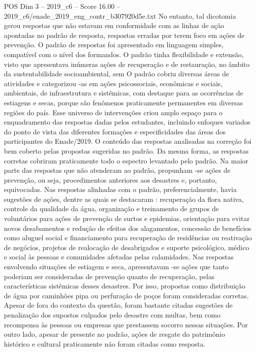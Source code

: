 \begin{textsample}{POS Dim 3 – 2019\_c6 – Score 16.00 – 2019\_c6/enade\_2019\_eng\_contr\_b307920d5e.txt}
No entanto, tal dicotomia gerou respostas que não estavam em conformidade com as linhas de ação apontadas no padrão de resposta, respostas erradas por terem foco em ações de prevenção.
O padrão de respostas foi apresentado em linguagem simples, compatível com o nível dos formandos.
O padrão tinha flexibilidade e extensão, visto que apresentava inúmeras ações de recuperação e de restauração, no âmbito da sustentabilidade socioambiental, sem O padrão cobriu diversas áreas de atividades e categorizou -as em ações psicossociais, econômicas e sociais, ambientais, de infraestrutura e sistêmicas, com destaque para as ocorrências de estiagens e secas, porque são fenômenos praticamente permanentes em diversas regiões do país.
Esse universo de intervenções criou amplo espaço para o enquadramento das respostas dadas pelos estudantes, incluindo enfoques variados do ponto de vista das diferentes formações e especificidades das áreas dos participantes do Enade/2019.
O conteúdo das respostas analisadas na correção foi bem coberto pelas propostas sugeridas no padrão.
Da mesma forma, as respostas corretas cobriram praticamente todo o espectro levantado pelo padrão.
Na maior parte das respostas que não atenderam ao padrão, propunham -se ações de prevenção, ou seja, procedimentos anteriores aos desastres e, portanto, equivocadas.
Nas respostas alinhadas com o padrão, preferencialmente, havia sugestões de ações, dentre as quais se destacaram : recuperação da flora nativa, controle da qualidade da água, organização e treinamento de grupos de voluntários para ações de prevenção de surtos e epidemias, orientação para evitar novos desabamentos e redução de efeitos dos alagamentos, concessão de benefícios como aluguel social e financiamento para recuperação de residências ou reativação de negócios, projetos de realocação de desabrigados e suporte psicológico, médico e social às pessoas e comunidades afetadas pelas calamidades.
Nas respostas envolvendo situações de estiagem e seca, apresentavam -se ações que tanto poderiam ser consideradas de prevenção quanto de recuperação, pelas características sistêmicas desses desastres.
Por isso, propostas como distribuição de água por caminhões pipa ou perfuração de poços foram consideradas corretas.
Apesar de fora do contexto da questão, foram bastante citadas sugestões de penalização dos supostos culpados pelo desastre com multas, bem como recompensa às pessoas ou empresas que prestassem socorro nessas situações.
Por outro lado, apesar de presente no padrão, ações de resgate do patrimônio histórico e cultural praticamente não foram citadas como resposta.

\end{textsample}
